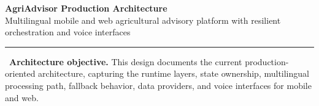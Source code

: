\documentclass[10pt,a4paper]{article}
\begin{document}

{\LARGE\bfseries AgriAdvisor Production Architecture}\\[0mm]
{\small Multilingual mobile and web agricultural advisory platform with resilient orchestration and voice interfaces}

\vspace{2mm}
\hrule
\vspace{3mm}

\textnormal{\faInfoCircle}\ \textbf{Architecture objective.}
This design documents the current production-oriented architecture, capturing the runtime layers, state ownership, multilingual processing path, fallback behavior, data providers, and voice interfaces for mobile and web.
\end{document}
